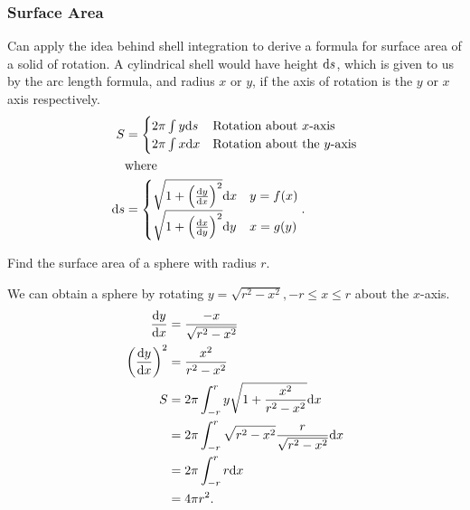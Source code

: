 \subsubsection{Surface Area}
Can apply the idea behind shell integration to derive a formula for surface area of a solid of rotation.
A cylindrical shell would have height $\mathrm{d} s$, which is given to us by the arc length formula, and radius $x$ or $y$, if the axis of rotation is the $y$ or $x$ axis respectively.
\begin{align*}
	S &= \begin{cases}
		2\pi\int{y\mathrm{d} s} & \text{Rotation about $x$-axis} \\
		2\pi\int{x\mathrm{d} x} & \text{Rotation about the $y$-axis}
	\end{cases} \\
	& \text{where } \\
	\mathrm{d} s &= \begin{cases}
		\sqrt{1+\left(\frac{\mathrm{d} y}{\mathrm{d} x}\right)^2}\mathrm{d} x & y=f(x) \\
		\sqrt{1+\left(\frac{\mathrm{d} x}{\mathrm{d} y}\right)^2}\mathrm{d} y & x=g(y) \\
	\end{cases}.
\end{align*}

\begin{example}
	Find the surface area of a sphere with radius $r$.
\end{example}
We can obtain a sphere by rotating $y=\sqrt{r^2-x^2}, -r\leq x\leq r$ about the $x$-axis.
\begin{align*}
	\frac{\mathrm{d} y}{\mathrm{d} x} &= \frac{-x}{\sqrt{r^2-x^2}} \\
	\left(\frac{\mathrm{d} y}{\mathrm{d} x}\right)^2 &= \frac{x^2}{r^2-x^2} \\
	S &= 2\pi\int_{-r}^{r}{y\sqrt{1+\frac{x^2}{r^2-x^2}}\mathrm{d} x} \\
	&= 2\pi\int_{-r}^{r}{\sqrt{r^2-x^2}\frac{r}{\sqrt{r^2-x^2}}\mathrm{d} x} \\
	&= 2\pi\int_{-r}^{r}{r\mathrm{d} x} \\
	&= 4\pi r^2.
\end{align*}